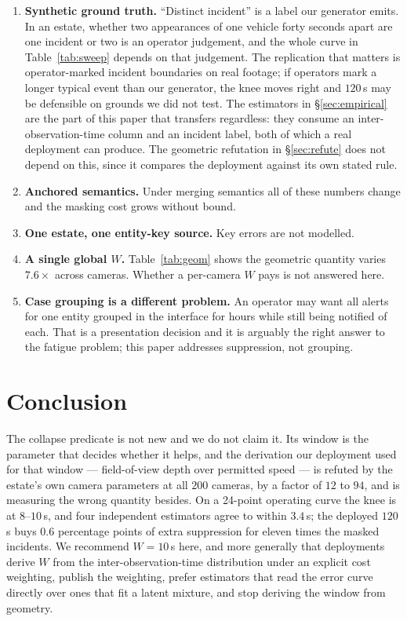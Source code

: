\documentclass[11pt,a4paper]{article}
\begin{document}
\begin{enumerate}
\item \textbf{Synthetic ground truth.} ``Distinct incident'' is a label our
generator emits. In an estate, whether two appearances of one vehicle forty
seconds apart are one incident or two is an operator judgement, and the whole
curve in Table~\ref{tab:sweep} depends on that judgement. The replication that
matters is operator-marked incident boundaries on real footage; if operators mark
a longer typical event than our generator, the knee moves right and $120$\,s may
be defensible on grounds we did not test. The estimators in
\S\ref{sec:empirical} are the part of this paper that transfers regardless: they
consume an inter-observation-time column and an incident label, both of which a
real deployment can produce. The geometric refutation in
\S\ref{sec:refute} does not depend on this, since it compares the deployment
against its own stated rule.
\item \textbf{Anchored semantics.} Under merging semantics all of these numbers
change and the masking cost grows without bound.
\item \textbf{One estate, one entity-key source.} Key errors are not modelled.
\item \textbf{A single global $W$.} Table~\ref{tab:geom} shows the geometric
quantity varies $7.6\times$ across cameras. Whether a per-camera $W$ pays is not
answered here.
\item \textbf{Case grouping is a different problem.} An operator may want all
alerts for one entity grouped in the interface for hours while still being
notified of each. That is a presentation decision and it is arguably the right
answer to the fatigue problem; this paper addresses suppression, not grouping.
\end{enumerate}

\section{Conclusion}

The collapse predicate is not new and we do not claim it. Its window is the
parameter that decides whether it helps, and the derivation our deployment used
for that window --- field-of-view depth over permitted speed --- is refuted by the
estate's own camera parameters at all $200$ cameras, by a factor of $12$ to $94$,
and is measuring the wrong quantity besides. On a 24-point operating curve the
knee is at $8$--$10$\,s, and four independent estimators agree to within
$3.4$\,s; the deployed $120$\,s buys $0.6$ percentage points of extra
suppression for eleven times the masked incidents. We recommend $W = 10$\,s
here, and more generally that deployments derive $W$ from the
inter-observation-time distribution under an explicit cost weighting, publish
the weighting, prefer estimators that read the error curve directly over ones
that fit a latent mixture, and stop deriving the window from geometry.
\end{document}
